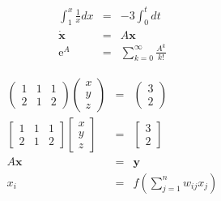 \documentclass[a4paper,11pt,dvipdfmx]{jarticle}
\begin{document}
\vskip 1mm

\begin{eqnarray}
\int_1^{x} \frac{1}{x}dx   & = &  - 3 \int_0^t dt \\
\dot {\bm{x}} & = & A \bm{x} \\
\mathrm{e}^{A} & = & \sum_{k=0}^\infty \frac{A^k}{k!}
\end{eqnarray}

\begin{eqnarray}
\begin{pmatrix}
1 & 1 & 1 \\
2 & 1 & 2
\end{pmatrix}
\begin{pmatrix}
x \\
y \\
z
\end{pmatrix} 
& = &
\begin{pmatrix}
3 \\
2
\end{pmatrix}
\\
\begin{bmatrix}
1 & 1 & 1 \\
2 & 1 & 2
\end{bmatrix}
\begin{bmatrix}
x \\
y \\
z
\end{bmatrix} 
& = &
\begin{bmatrix}
3 \\
2
\end{bmatrix}
\\
A \bm{x}  & = & \bm{y}
\\
x_i & = & f(\sum_{j=1}^n w_{ij}  x_j )
\end{eqnarray}
\end{document}
